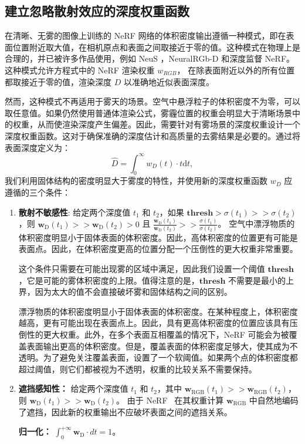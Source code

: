 \subsection{建立忽略散射效应的深度权重函数}
在清晰、无雾的图像上训练的 NeRF 网络的体积密度输出遵循一种模式，即在表面位置附近取大值，在相机原点和表面之间取接近于零的值。这种模式在物理上是合理的，并已被许多作品使用，例如 NeuS \cite{wang_neus_2021}，NeuralRGb-D\cite{azinovic_neural_2022} 和深度监督 NeRF\cite{deng_depth-supervised_2022}。这种模式允许方程式中的 NeRF 渲染权重 $w_{RGB}$， 在除表面附近以外的所有位置都取接近于零的值，渲染深度 $D$ 以准确地近似表面深度。

然而，这种模式不再适用于雾天的场景。空气中悬浮粒子的体积密度不为零，可以取任意值。如果仍然使用普通体渲染公式，雾霾位置的权重会明显大于清晰场景中的权重，从而使渲染深度产生偏差。因此，需要针对有雾场景的深度权重设计一个深度权重函数。这对于确保准确的深度估计和高质量的去雾结果是必要的。通过将表面深度定义为：
\begin{equation}
    \hat{D} =\int_0^\infty w_D(t)\cdot t\text{d}t,
\end{equation}
我们利用固体结构的密度明显大于雾度的特性，并使用新的深度权重函数 $w_D$ 应遵循的三个条件：
\begin{enumerate}
    \item \textbf{散射不敏感性}: 给定两个深度值 $t_1$ 和 $t_2$，如果 $\mathbf{thresh} > \sigma (t_1) >> \sigma (t_2)$，则 $ \mathbf{w}_\text{D}(t_1) >> \mathbf{w}_\text{D}(t_2) > 0$ 且 $\frac{\mathbf{w}_\text{D}(t_1)}{\mathbf{w}_\text{D}(t_2)} >> \frac{\sigma (t_1)}{\sigma (t_2)}$。
空气中漂浮物质的体积密度明显小于固体表面的体积密度。因此，高体积密度的位置更有可能是表面点。因此，在体积密度更高的位置分配一个压倒性的更大权重非常重要。

这个条件只需要在可能出现雾的区域中满足，因此我们设置一个阈值 $\mathbf{thresh}$，它是可能的雾体积密度的上限。值得注意的是，$\mathbf{thresh}$ 不需要是最小的上界，因为太大的值不会直接破坏雾和固体结构之间的区别。

漂浮物质的体积密度明显小于固体表面的体积密度。在某种程度上，体积密度越高，更有可能出现在表面点上。因此，具有更高体积密度的位置应该具有压倒性的更大权重。此外，在多个表面互相覆盖的情况下，NeRF 可能会为被覆盖表面输出更高的体积密度。但是，覆盖表面的体积密度足够大，使其成为不透明。为了避免关注覆盖表面，设置了一个软阈值。如果两个点的体积密度都超过阈值，则它们都被视为不透明，权重的比较关系不需要保持。

\item \textbf{遮挡感知性：} 给定两个深度值 $t_1$ 和 $t_2$，其中 $\mathbf{w}_\text{RGB}(t_1) >> \mathbf{w}_\text{RGB}(t_2)$，则 $ \mathbf{w}_\text{D}(t_1) >> \mathbf{w}_\text{D}(t_2)$。
由于 NeRF~\cite{mildenhall_nerf_2020} 在其权重计算 $\mathbf{w}_\text{RGB}$ 中自然地编码了遮挡，因此新的权重输出不应破坏表面之间的遮挡关系。


\textbf{归一化：} $ \int_0^{+\infty} \mathbf{w}_\text{D} \cdot {d}t = 1 $。
\end{enumerate}


